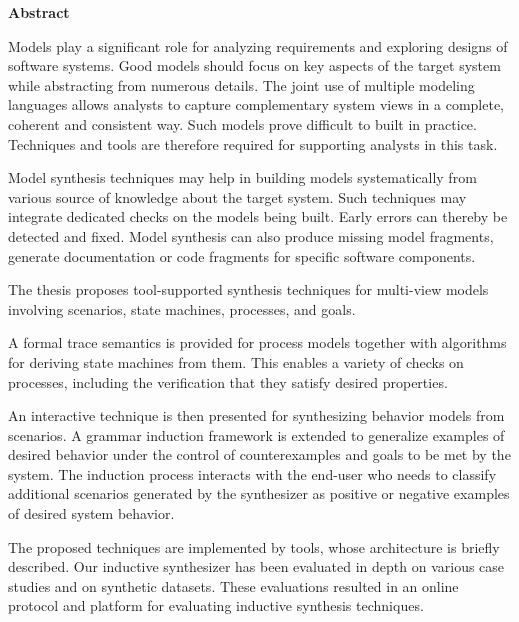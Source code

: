 \begin{center}
\textbf{\large Abstract}
\end{center}

Models play a significant role for analyzing requirements and exploring designs of software systems. Good models should focus on key aspects of the target system while abstracting from numerous details. The joint use of multiple modeling languages allows analysts to capture complementary system views in a complete, coherent and consistent way. Such models prove difficult to built in practice. Techniques and tools are therefore required for supporting analysts in this task.

Model synthesis techniques may help in building models systematically from various source of knowledge about the target system. Such techniques may integrate dedicated checks on the models being built. Early errors can thereby be detected and fixed. Model synthesis can also produce missing model fragments, generate documentation or code fragments for specific software components.

The thesis proposes tool-supported synthesis techniques for multi-view models involving scenarios, state machines, processes, and goals. 

A formal trace semantics is provided for process models together with algorithms for deriving state machines from them. This enables a variety of checks on processes, including the verification that they satisfy desired properties.

An interactive technique is then presented for synthesizing behavior models from scenarios. A grammar induction framework is extended to generalize examples of desired behavior under the control of counterexamples and goals to be met by the system. The induction process interacts with the end-user who needs to classify additional scenarios generated by the synthesizer as positive or negative examples of desired system behavior.

The proposed techniques are implemented by tools, whose architecture is briefly described. Our inductive synthesizer has been evaluated in depth on various case studies and on synthetic datasets. These evaluations resulted in an online protocol and platform for evaluating inductive synthesis techniques.
